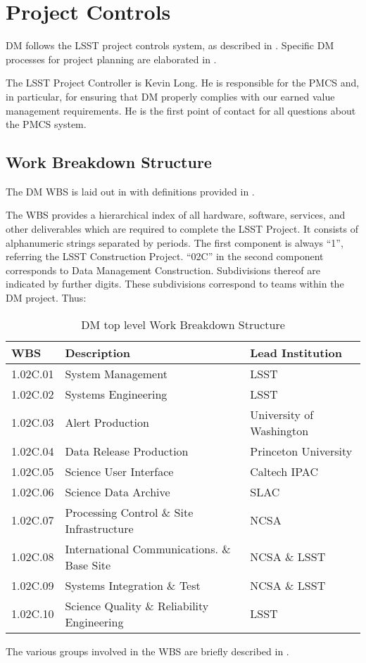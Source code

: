 \section{Project Controls}

DM follows the LSST project controls system, as described in .
Specific DM processes for project planning are elaborated in .

The LSST Project Controller is Kevin Long.
He is responsible for the PMCS and, in particular, for ensuring that DM properly complies with our earned value management requirements.
He is the first point of contact for all questions about the PMCS system.

\subsection{Work Breakdown Structure}
\label{sect:WBS}

The DM WBS is laid out in  with definitions provided in .

The WBS provides a hierarchical index of all hardware, software, services, and other deliverables which are required to complete the LSST Project.
It consists of alphanumeric strings separated by periods.
The first component is always “1”, referring the LSST Construction Project.
``02C'' in the second component corresponds to Data Management Construction.
Subdivisions thereof are indicated by further digits.
These subdivisions correspond to teams within the DM project.
Thus:

\begin{table}
\caption{DM top level Work Breakdown Structure \label{tab:wbs}}
\begin{tabular}[htb]{l|l|l}\\ \hline
{\bf WBS}    &  {\bf Description}   &                            {\bf Lead Institution}\\ \hline
	1.02C.01& System Management                       &  LSST\\ \hline
	1.02C.02& Systems Engineering                     &  LSST\\ \hline
	1.02C.03& Alert Production                        &  University of Washington\\ \hline
	1.02C.04& Data Release Production                 &  Princeton University\\ \hline
	1.02C.05& Science User Interface                  &  Caltech IPAC\\ \hline
	1.02C.06& Science Data Archive                    &  SLAC\\ \hline
	1.02C.07& Processing Control \& Site Infrastructure & NCSA\\ \hline
	1.02C.08& International Communications. \& Base Site& NCSA \& LSST\\ \hline
	1.02C.09& Systems Integration \& Test               & NCSA \& LSST\\ \hline
	1.02C.10& Science Quality \& Reliability Engineering& LSST\\ \hline
\end{tabular}
\end{table}

The various groups involved in the WBS are briefly described in .
